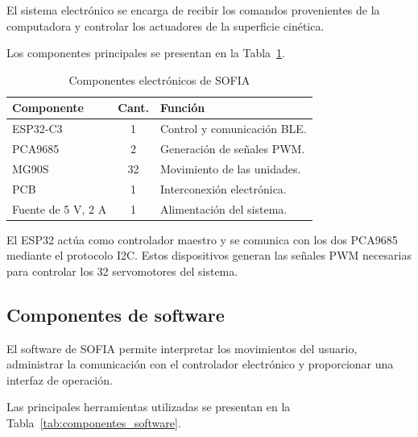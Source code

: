 \documentclass[letterpaper,journal]{IEEEtran}
\begin{document}
El sistema electrónico se encarga de recibir los comandos
provenientes de la computadora y controlar los actuadores
de la superficie cinética.

Los componentes principales se presentan en la
Tabla~\ref{tab:componentes_electronicos}.

\begin{table}[!t]
    \caption{Componentes electrónicos de SOFIA}
    \label{tab:componentes_electronicos}
    \centering
    \footnotesize
    \begin{tabularx}{\columnwidth}{l c X}
        \toprule
        \textbf{Componente} & \textbf{Cant.} & \textbf{Función} \\
        \midrule
        ESP32-C3 & 1 & Control y comunicación BLE. \\
        PCA9685 & 2 & Generación de señales PWM. \\
        MG90S & 32 & Movimiento de las unidades. \\
        PCB & 1 & Interconexión electrónica. \\
        Fuente de 5 V, 2 A & 1 & Alimentación del sistema. \\
        \bottomrule
    \end{tabularx}
\end{table}

El ESP32 actúa como controlador maestro y se comunica con
los dos PCA9685 mediante el protocolo I2C. Estos dispositivos
generan las señales PWM necesarias para controlar los
32 servomotores del sistema.

\subsection{Componentes de software}

El software de SOFIA permite interpretar los movimientos
del usuario, administrar la comunicación con el controlador
electrónico y proporcionar una interfaz de operación.

Las principales herramientas utilizadas se presentan en
la Tabla~\ref{tab:componentes_software}.
\end{document}
